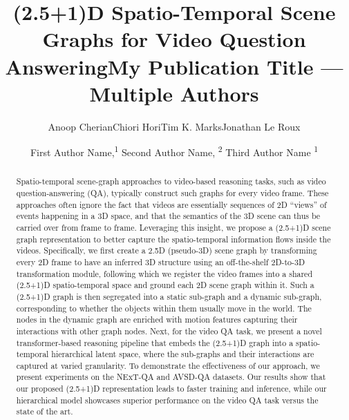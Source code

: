 \documentclass[letterpaper]{article} \usepackage{aaai22}  \usepackage{times}  \usepackage{helvet}  \usepackage{courier}  \usepackage[hyphens]{url}  \usepackage{graphicx} \urlstyle{rm} \def\UrlFont{\rm}  \usepackage{natbib}  \usepackage{caption} \DeclareCaptionStyle{ruled}{labelfont=normalfont,labelsep=colon,strut=off} \frenchspacing  \setlength{\pdfpagewidth}{8.5in}  \setlength{\pdfpageheight}{11in}  \usepackage{algorithm}
\title{(2.5+1)D Spatio-Temporal Scene Graphs for Video Question Answering}
\author{
Anoop Cherian\qquad Chiori Hori\qquad Tim K. Marks\qquad Jonathan Le Roux
}
\title{My Publication Title --- Multiple Authors}
\author {
First Author Name,\textsuperscript{\rm 1}
    Second Author Name, \textsuperscript{\rm 2}
    Third Author Name \textsuperscript{\rm 1}
}
\newcommand{\name}{(2.5+1)D\xspace}
\begin{document}
\maketitle
\begin{abstract}
Spatio-temporal scene-graph approaches to video-based reasoning tasks, such as video question-answering (QA), typically construct such graphs for every video frame. These approaches often ignore the fact that videos are essentially sequences of 2D ``views'' of events happening in a 3D space, and that the semantics of the 3D scene can thus be carried over from frame to frame. Leveraging this insight, we propose a \name scene graph representation to better capture the spatio-temporal information flows inside the videos. Specifically, we first create a 2.5D (pseudo-3D) scene graph by transforming every 2D frame to have an inferred 3D structure using an off-the-shelf 2D-to-3D transformation module, following which we register the video frames into a shared \name spatio-temporal space and ground each 2D scene graph within it. Such a \name graph is then segregated into a static sub-graph and a dynamic sub-graph, corresponding to whether the objects within them usually move in the world. The nodes in the dynamic graph are enriched with motion features capturing their interactions with other graph nodes. Next, for the video QA task, we present a novel transformer-based reasoning pipeline that embeds the \name graph into a spatio-temporal hierarchical latent space, where the sub-graphs and their interactions are captured at varied granularity. To demonstrate the effectiveness of our approach, we present experiments on the NExT-QA and AVSD-QA datasets. Our results show that our proposed \name representation leads to faster training and inference, while our hierarchical model showcases superior performance on the video QA task versus the state of the art. 
\end{abstract}
\end{document}

